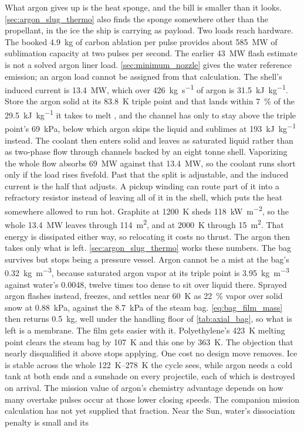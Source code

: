 \documentclass{article}
\begin{document}
What argon gives up is the heat sponge, and the bill is smaller than it looks. \autoref{sec:argon_slug_thermo} also finds the sponge somewhere other than the propellant, in the ice the ship is carrying as payload. Two loads reach hardware. The booked \SI{4.9}{\kilogram} of carbon ablation per pulse provides about \SI{585}{\mega\watt} of sublimation capacity at two pulses per second. The earlier \SI{43}{\mega\watt} flash estimate is not a solved argon liner load. \autoref{sec:minimum_nozzle} gives the water reference emission; an argon load cannot be assigned from that calculation. The shell's induced current is \SI{13.4}{\mega\watt}, which over \SI{426}{\kilogram\per\second} of argon is \SI{31.5}{\kilo\joule\per\kilogram}. Store the argon solid at its \SI{83.8}{\kelvin} triple point and that lands within \SI{7}{\percent} of the \SI{29.5}{\kilo\joule\per\kilogram} it takes to melt \cite{crc_handbook}, and the channel has only to stay above the triple point's \SI{69}{\kilo\pascal}, below which argon skips the liquid and sublimes at \SI{193}{\kilo\joule\per\kilogram} instead. The coolant then enters solid and leaves as saturated liquid rather than as two-phase flow through channels backed by an eight tonne shell. Vaporizing the whole flow absorbs \SI{69}{\mega\watt} against that \SI{13.4}{\mega\watt}, so the coolant runs short only if the load rises fivefold. Past that the split is adjustable, and the induced current is the half that adjusts. A pickup winding can route part of it into a refractory resistor instead of leaving all of it in the shell, which puts the heat somewhere allowed to run hot. Graphite at \SI{1200}{\kelvin} sheds \SI{118}{\kilo\watt\per\square\meter}, so the whole \SI{13.4}{\mega\watt} leaves through \SI{114}{\square\meter}, and at \SI{2000}{\kelvin} through \SI{15}{\square\meter}. That energy is dissipated either way, so relocating it costs no thrust. The argon then takes only what is left. \autoref{sec:argon_slug_thermo} works these numbers. The bag survives but stops being a pressure vessel. Argon cannot be a mist at the bag's \SI{0.32}{\kilogram\per\cubic\meter}, because saturated argon vapor at its triple point is \SI{3.95}{\kilogram\per\cubic\meter} against water's \num{0.0048}, twelve times too dense to sit over liquid there. Sprayed argon flashes instead, freezes, and settles near \SI{60}{\kelvin} as \SI{22}{\percent} vapor over solid snow at \SI{0.88}{\kilo\pascal}, against the \SI{8.7}{\kilo\pascal} of the steam bag. \autoref{eq:bag_film_mass} then returns \SI{0.5}{\kilogram}, well under the handling floor of \autoref{tab:axial_bag}, so what is left is a membrane. The film gets easier with it. Polyethylene's \SI{423}{\kelvin} melting point clears the steam bag by \SI{107}{\kelvin} and this one by \SI{363}{\kelvin}. The objection that nearly disqualified it above stops applying. One cost no design move removes. Ice is stable across the whole \SIrange{122}{278}{\kelvin} the cycle sees, while argon needs a cold tank at both ends and a sunshade on every projectile, each of which is destroyed on arrival. The mission value of argon's chemistry advantage depends on how many overtake pulses occur at those lower closing speeds. The companion mission calculation has not yet supplied that fraction. Near the Sun, water's dissociation penalty is small and its 
\end{document}
